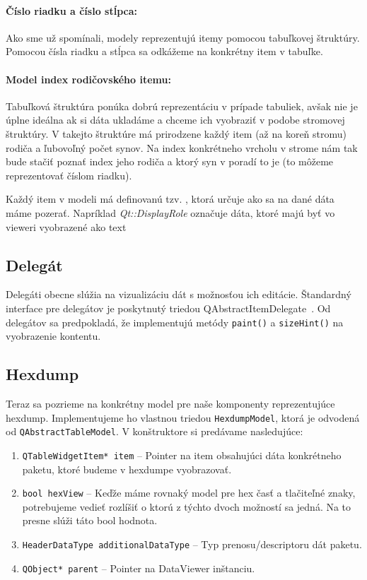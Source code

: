 \paragraph{Číslo riadku a číslo stĺpca:} Ako sme už spomínali, modely reprezentujú itemy pomocou tabuľkovej štruktúry. Pomocou čísla riadku a stĺpca sa odkážeme na konkrétny item v tabuľke.
\paragraph{Model index rodičovského itemu:}  Tabuľková štruktúra ponúka dobrú reprezentáciu v prípade tabuliek, avšak nie je úplne ideálna ak si dáta ukladáme a chceme ich vyobraziť v podobe stromovej štruktúry. V takejto štruktúre má prirodzene každý item (až na koreň stromu) rodiča a ľubovoľný počet synov. Na index konkrétneho vrcholu v strome nám tak bude stačiť poznať index jeho rodiča a ktorý syn v poradí to je (to môžeme reprezentovať číslom riadku).

Každý item v modeli má definovanú tzv. , ktorá určuje ako sa na dané dáta máme pozerať. Napríklad \textit{Qt::DisplayRole} označuje dáta, ktoré majú byť vo vieweri vyobrazené ako text


\subsection{Delegát}
\label{kap04:sec:delegate}
Delegáti obecne slúžia na vizualizáciu dát s možnosťou ich editácie. Štandardný interface pre delegátov je poskytnutý triedou QAbstractItemDelegate~\cite{qabstractitemdelegate}. Od delegátov sa predpokladá, že implementujú metódy \texttt{paint()} a \texttt{sizeHint()} na vyobrazenie kontentu.


\subsection{Hexdump}
Teraz sa pozrieme na konkrétny model pre naše komponenty reprezentujúce hexdump. Implementujeme ho vlastnou triedou \texttt{HexdumpModel}, ktorá je odvodená od \texttt{QAbstractTableModel}. V konštruktore si predávame nasledujúce:
\begin{enumerate}
\item \texttt{QTableWidgetItem* item} -- Pointer na item obsahujúci dáta konkrétneho paketu, ktoré budeme v hexdumpe vyobrazovať.

\item \texttt{bool hexView} -- Keďže máme rovnaký model pre hex časť a tlačiteľné znaky, potrebujeme vedieť rozlíšiť o ktorú z týchto dvoch možností sa jedná. Na to presne slúži táto bool hodnota.

\item \texttt{HeaderDataType additionalDataType} -- Typ prenosu/descriptoru dát paketu.

\item \texttt{QObject* parent} -- Pointer na DataViewer inštanciu.
\end{enumerate}

